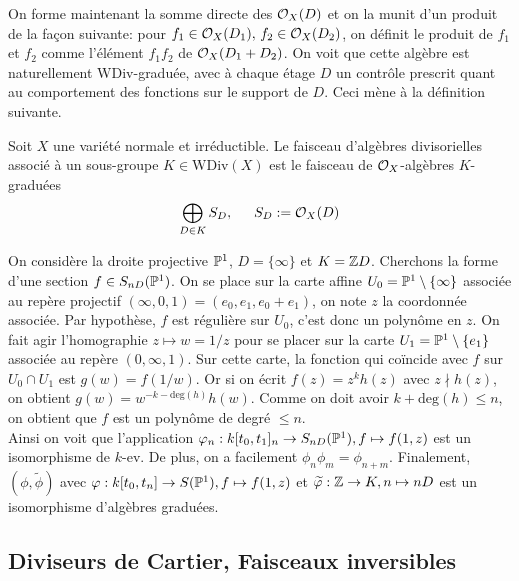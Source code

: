 On forme maintenant la somme directe des $\mathcal{O}_X(D)$ et on la munit d'un produit de la façon suivante: pour $f_1\in \mathcal{O}_X(D_1),\, f_2\in \mathcal{O}_X(D_2)$, on définit le produit de $f_1$ et $f_2$ comme l'élément $f_1f_2$ de $\mathcal{O}_X(D_1+D_2)$. On voit que cette algèbre est naturellement WDiv-graduée, avec à chaque étage $D$ un contrôle prescrit quant au comportement des fonctions sur le support de $D$. Ceci mène à la définition suivante.

\begin{defn}
Soit $X$ une variété normale et irréductible. Le faisceau d'algèbres divisorielles associé à un sous-groupe $K\in $WDiv$(X)$ est le faisceau de $\mathcal{O}_X$-algèbres $K$-graduées $$\bigoplus_{D\in K}S_D,\,\,\,\,\,\,\,\,\, S_D:=\mathcal{O}_X(D)$$ 
\end{defn}

\begin{ex}
On considère la droite projective $\mathbb{P}^1$, $D=\lbrace\infty\rbrace$ et $K=\mathbb{Z} D$. Cherchons la forme d'une section $f\in S_{nD}(\mathbb{P}^1)$. On se place sur la carte affine $U_0=\mathbb{P}^1\setminus \lbrace \infty\rbrace$ associée au repère projectif $(\infty, 0, 1)=(e_0,e_1,e_0+e_1)$, on note $z$ la coordonnée associée. Par hypothèse, $f$ est régulière sur $U_0$, c'est donc un polynôme en $z$. On fait agir l'homographie $z\mapsto w=1/z$  pour se placer sur la carte $U_1=\mathbb{P}^1\setminus \lbrace e_1 \rbrace$ associée au repère $(0, \infty,1)$. Sur cette carte, la fonction qui coïncide avec $f$ sur $U_0\cap U_1$ est $g(w)=f(1/w)$. Or si on écrit $f(z)=z^kh(z)$ avec $z\nmid h(z)$, on obtient $g(w)=w^{-k-\textrm{deg}(h)}h(w)$. Comme on doit avoir $k+\textrm{deg}(h)\leq n$, on obtient que $f$ est un polynôme de degré $\leq n$.\\
Ainsi on voit que l'application $\varphi_n:k[t_0,t_1]_n\rightarrow S_{nD}(\mathbb{P}^1), f\mapsto f(1,z)$ est un isomorphisme de $k$-ev. De plus, on a facilement $\phi_n\phi_m=\phi_{n+m}$. Finalement, $(\phi, \widetilde{\phi})$ avec $\varphi: k[t_0,t_n]\rightarrow S(\mathbb{P}^1), f\mapsto f(1,z)$ et $\widetilde{\varphi}:\mathbb{Z}\rightarrow K, n\mapsto nD$ est un isomorphisme d'algèbres graduées.
\end{ex}

\subsection{Diviseurs de Cartier, Faisceaux inversibles}



